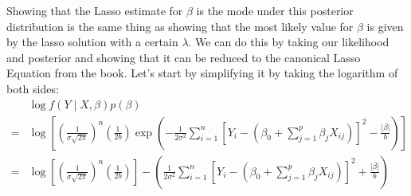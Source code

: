 \documentclass[10pt]{article}
\begin{document}
Showing that the Lasso estimate for $\beta$ is the mode under this posterior distribution is the same thing as showing that the most likely value for $\beta$ is given by the lasso solution with a certain $\lambda$. We can do this by taking our likelihood and posterior and showing that it can be reduced to the canonical Lasso Equation from the book.
Let's start by simplifying it by taking the logarithm of both sides:
\begin{align*}
    &\log
    f(Y \mid X, \beta)p(\beta)\\
    =&
    \log
    \left[
        \left(
            \frac{
                1
            }{
                \sigma \sqrt{2\pi}
            }
        \right)^n
        \left(
            \frac{
                1
            }{
                2b
            }
        \right)
        \exp
        \left(
            - \frac{
                1
            }{
                2\sigma^2
            }
            \sum_{i = 1}^{n}
            \left[
                Y_i - (\beta_0 + \sum_{j = 1}^{p} \beta_j X_{ij})
            \right]^2
            -
            \frac{
                \lvert \beta \rvert
            }{
                b
                }
        \right)
    \right]
    \\
    =&
    \log
    \left[
        \left(
            \frac{
                1
            }{
                \sigma \sqrt{2\pi}
            }
        \right)^n
        \left(
            \frac{
                1
            }{
                2b
            }
        \right)
    \right]
    -
    \left(
        \frac{
            1
        }{
            2\sigma^2
        }
        \sum_{i = 1}^{n}
        \left[
            Y_i - (\beta_0 + \sum_{j = 1}^{p} \beta_j X_{ij})
        \right]^2
        +
        \frac{
            \lvert \beta \rvert
        }{
            b
        }
    \right)
\end{align*}
\end{document}
